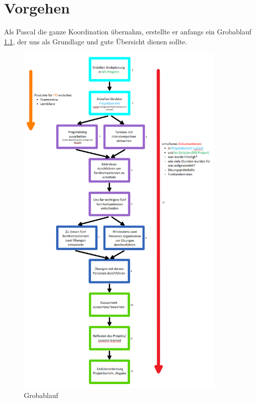 
\chapter{Vorgehen}
\label{sec:Vorgehen}

Als Pascal die ganze Koordination übernahm, erstellte er anfangs ein Grobablauf \ref{fig:grobablauf}, der uns als Grundlage und gute Übersicht dienen sollte.

\begin{figure}[ht]
	\centering
	\includegraphics[width=0.9\textwidth]{images/Grobablauf.png}
	\caption{Grobablauf}
	\label{fig:grobablauf}
\end{figure}

